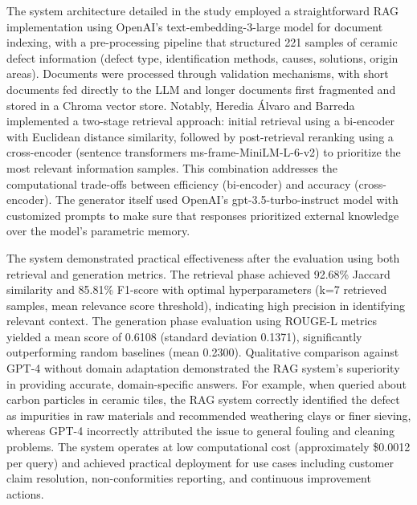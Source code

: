 The system architecture detailed in the study employed a straightforward RAG implementation using OpenAI's text-embedding-3-large model for document indexing, with a pre-processing pipeline that structured 221 samples of ceramic defect information (defect type, identification methods, causes, solutions, origin areas). Documents were processed through validation mechanisms, with short documents fed directly to the LLM and longer documents first fragmented and stored in a Chroma vector store. Notably, Heredia Álvaro and Barreda implemented a two-stage retrieval approach: initial retrieval using a bi-encoder with Euclidean distance similarity, followed by post-retrieval reranking using a cross-encoder (sentence transformers ms-frame-MiniLM-L-6-v2) to prioritize the most relevant information samples. This combination addresses the computational trade-offs between efficiency (bi-encoder) and accuracy (cross-encoder). The generator itself used OpenAI's gpt-3.5-turbo-instruct model with customized prompts to make sure that responses prioritized external knowledge over the model's parametric memory. \parencite{heredia_alvaro_advanced_2025}

The system demonstrated practical effectiveness after the evaluation using both retrieval and generation metrics. The retrieval phase achieved 92.68\% Jaccard similarity and 85.81\% F1-score with optimal hyperparameters (k=7 retrieved samples, mean relevance score threshold), indicating high precision in identifying relevant context. The generation phase evaluation using ROUGE-L metrics yielded a mean score of 0.6108 (standard deviation 0.1371), significantly outperforming random baselines (mean 0.2300). Qualitative comparison against GPT-4 without domain adaptation demonstrated the RAG system's superiority in providing accurate, domain-specific answers. For example, when queried about carbon particles in ceramic tiles, the RAG system correctly identified the defect as impurities in raw materials and recommended weathering clays or finer sieving, whereas GPT-4 incorrectly attributed the issue to general fouling and cleaning problems. The system operates at low computational cost (approximately \$0.0012 per query) and achieved practical deployment for use cases including customer claim resolution, non-conformities reporting, and continuous improvement actions. \parencite{heredia_alvaro_advanced_2025}

